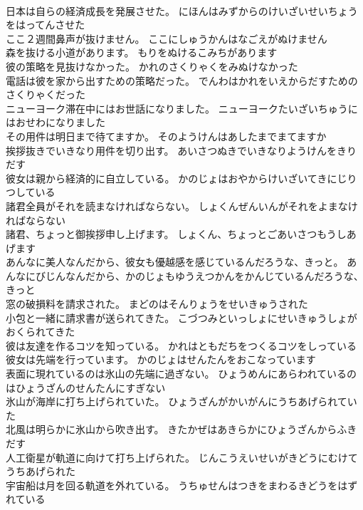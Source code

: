 \documentclass[8pt]{extreport}
\begin{document}
\begin{CJK}{UTF8}{min}
\\	日本は自らの経済成長を発展させた。	にほんはみずからのけいざいせいちょうをはってんさせた 
\\	ここ２週間鼻声が抜けません。	ここにしゅうかんはなごえがぬけません 
\\	森を抜ける小道があります。	もりをぬけるこみちがあります 
\\	彼の策略を見抜けなかった。	かれのさくりゃくをみぬけなかった 
\\	電話は彼を家から出すための策略だった。	でんわはかれをいえからだすためのさくりゃくだった 
\\	ニューヨーク滞在中にはお世話になりました。	ニューヨークたいざいちゅうにはおせわになりました 
\\	その用件は明日まで待てますか。	そのようけんはあしたまでまてますか 
\\	挨拶抜きでいきなり用件を切り出す。	あいさつぬきでいきなりようけんをきりだす 
\\	彼女は親から経済的に自立している。	かのじょはおやからけいざいてきにじりつしている 
\\	諸君全員がそれを読まなければならない。	しょくんぜんいんがそれをよまなければならない 
\\	諸君、ちょっと御挨拶申し上げます。	しょくん、ちょっとごあいさつもうしあげます 
\\	あんなに美人なんだから、彼女も優越感を感じているんだろうな、きっと。	あんなにびじんなんだから、かのじょもゆうえつかんをかんじているんだろうな、きっと 
\\	窓の破損料を請求された。	まどのはそんりょうをせいきゅうされた 
\\	小包と一緒に請求書が送られてきた。	こづつみといっしょにせいきゅうしょがおくられてきた 
\\	彼は友達を作るコツを知っている。	かれはともだちをつくるコツをしっている 
\\	彼女は先端を行っています。	かのじょはせんたんをおこなっています 
\\	表面に現れているのは氷山の先端に過ぎない。	ひょうめんにあらわれているのはひょうざんのせんたんにすぎない 
\\	氷山が海岸に打ち上げられていた。	ひょうざんがかいがんにうちあげられていた 
\\	北風は明らかに氷山から吹き出す。	きたかぜはあきらかにひょうざんからふきだす 
\\	人工衛星が軌道に向けて打ち上げられた。	じんこうえいせいがきどうにむけてうちあげられた 
\\	宇宙船は月を回る軌道を外れている。	うちゅせんはつきをまわるきどうをはずれている 

\end{CJK}
\end{document}
